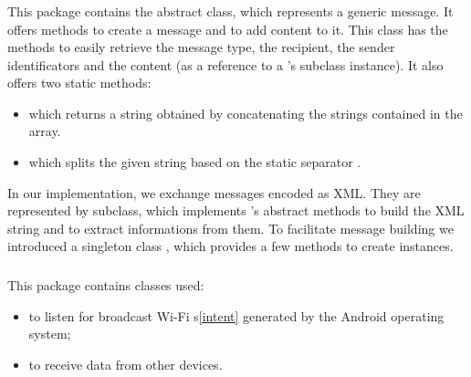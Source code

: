 	\subsubsection{}
	This package contains the  abstract class, which represents a generic message. It offers methods to create a message and to add content to it. This class has the methods to easily retrieve the message type, the recipient, the sender identificators and the content (as a reference to a 's subclass instance). It also offers two static methods:
	\begin{itemize}
		\item {} which returns a string obtained by concatenating the strings contained in the  array.
		\item {} which splits the given string based on the static separator . 
	\end{itemize}
	In our implementation, we exchange messages encoded as XML. They are represented by  subclass, which implements 's abstract methods to build the XML string and to extract informations from them. To facilitate message building we introduced a singleton class , which provides a few methods to create  instances.
	\hfill\\
	\subsubsection{}
	This package contains classes used:
	\begin{itemize}
		\item to listen for broadcast Wi-Fi  s\ref{intent} generated by the Android operating system;
		\item to receive data from other devices.
	\end{itemize}
	

